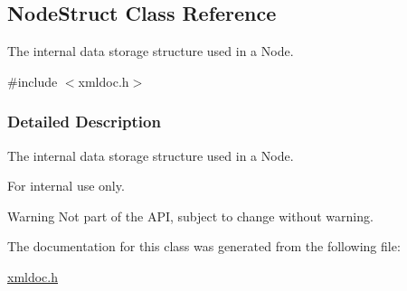\hypertarget{classNodeStruct}{
\subsection{NodeStruct Class Reference}
\label{d4/d18/classNodeStruct}
}


The internal data storage structure used in a Node.  




{\ttfamily \#include $<$xmldoc.h$>$}



\subsubsection{Detailed Description}
The internal data storage structure used in a Node. \begin{DoxyInternal}{For internal use only.}
\begin{DoxyWarning}{Warning}
Not part of the API, subject to change without warning. 
\end{DoxyWarning}
\end{DoxyInternal}


The documentation for this class was generated from the following file:\begin{DoxyCompactItemize}
\item 
\hyperlink{xmldoc_8h}{xmldoc.h}\end{DoxyCompactItemize}
